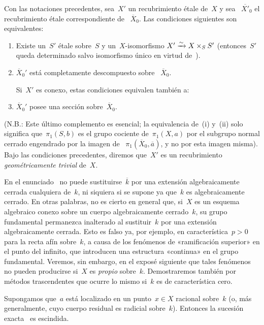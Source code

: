 \begin{corollaire}
\label{IX.6.2}
Con las notaciones precedentes, sea~$X'$ un recubrimiento étale de~$X$ y sea
~$\overline{X'}_0$ el recubrimiento étale correspondiente de
~$\overline{X}_0$. Las condiciones siguientes son equivalentes:
\begin{enumerate}
\item[(i)] Existe un~$S'$ étale sobre~$S$ y un~$X$-isomorfismo
$X'\xrightarrow{\sim} X\times_S S'$ (entonces~$S'$ queda determinado salvo isomorfismo
único en virtud de~).
\item[(ii)] $\overline{X}_0'$ está completamente descompuesto sobre
~$\overline{X}_0$.

Si~$X'$ es conexo, estas condiciones equivalen también a:
\item[(ii~bis)] $\overline{X}_0'$ posee una sección sobre~$\overline{X}_0$.
\end{enumerate}
\end{corollaire}

(N.B.: Este último complemento es esencial; la equivalencia de~(i) y~(ii)
solo significa que~$\pi_1(S,b)$ es el grupo cociente de~$\pi_1(X,a)$ por el
subgrupo
normal cerrado engendrado por la imagen de
~$\pi_1(\overline{X}_0,\overline{a})$, y no por esta imagen misma). Bajo las
condiciones precedentes, diremos que~$X'$ es un recubrimiento
\emph{geométricamente trivial}
%
de~$X$.

\begin{remarque}
\label{IX.6.3}
En el enunciado~ no puede sustituirse~$\overline{k}$ por una
extensión algebraicamente cerrada cualquiera de~$k$, ni siquiera si se supone
ya que~$k$ es algebraicamente cerrado. En otras palabras, no es cierto en
general que, si~$X$ es un esquema algebraico conexo sobre un cuerpo
algebraicamente cerrado~$k$, su grupo fundamental permanezca inalterado al
sustituir~$k$ por una extensión algebraicamente cerrada. Esto es falso ya, por
ejemplo, en característica~$p>0$ para la recta afín sobre~$k$, a causa de los
fenómenos de «ramificación superior» en el punto del infinito, que introducen
una estructura «continua» en el grupo fundamental. Veremos, sin embargo, en el
exposé siguiente que tales fenómenos no pueden producirse si~$X$ es
\emph{propio} sobre~$k$. Demostraremos también por métodos trascendentes que
ocurre lo mismo si~$k$ es de característica cero.
\end{remarque}

\begin{corollaire}
\label{IX.6.4}
Supongamos que~$a$ está localizado en un punto~$x\in X$ racional sobre~$k$ (o,
más generalmente, cuyo cuerpo residual es radicial sobre~$k$). Entonces la
sucesión exacta~ es escindida.
\end{corollaire}

